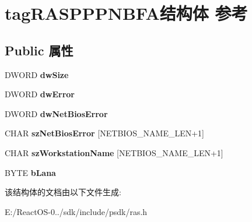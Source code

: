 \hypertarget{structtag_r_a_s_p_p_p_n_b_f_a}{}\section{tag\+R\+A\+S\+P\+P\+P\+N\+B\+F\+A结构体 参考}
\label{structtag_r_a_s_p_p_p_n_b_f_a}
\subsection*{Public 属性}
\begin{DoxyCompactItemize}
\item 
\mbox{\label{structtag_r_a_s_p_p_p_n_b_f_a_a825e03daa7e087237f09bf5fb4822551}} 
D\+W\+O\+RD {\bfseries dw\+Size}
\item 
\mbox{\label{structtag_r_a_s_p_p_p_n_b_f_a_aa9f9b98f95c4163d3b42b059cb38faae}} 
D\+W\+O\+RD {\bfseries dw\+Error}
\item 
\mbox{\label{structtag_r_a_s_p_p_p_n_b_f_a_ae73adc3c0db936d98bd01173a5c4a9e7}} 
D\+W\+O\+RD {\bfseries dw\+Net\+Bios\+Error}
\item 
\mbox{\label{structtag_r_a_s_p_p_p_n_b_f_a_a4ea378f2a222f20dd4cb742704259428}} 
C\+H\+AR {\bfseries sz\+Net\+Bios\+Error} \mbox{[}N\+E\+T\+B\+I\+O\+S\+\_\+\+N\+A\+M\+E\+\_\+\+L\+EN+1\mbox{]}
\item 
\mbox{\label{structtag_r_a_s_p_p_p_n_b_f_a_a02380769bd20e1111c4897833d26ed64}} 
C\+H\+AR {\bfseries sz\+Workstation\+Name} \mbox{[}N\+E\+T\+B\+I\+O\+S\+\_\+\+N\+A\+M\+E\+\_\+\+L\+EN+1\mbox{]}
\item 
\mbox{\label{structtag_r_a_s_p_p_p_n_b_f_a_ad9ab441b6efdbfb336df30bb21b98895}} 
B\+Y\+TE {\bfseries b\+Lana}
\end{DoxyCompactItemize}


该结构体的文档由以下文件生成\+:\begin{DoxyCompactItemize}
\item 
E\+:/\+React\+O\+S-\/0../sdk/include/psdk/ras.\+h\end{DoxyCompactItemize}
